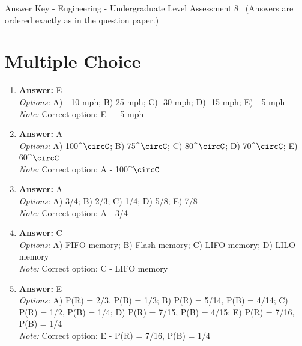 \documentclass[12pt]{article}
\begin{document}
\begin{center}
Answer Key - Engineering - Undergraduate Level Assessment 8 \
\small (Answers are ordered exactly as in the question paper.)
\end{center}

\section*{Multiple Choice}
\begin{enumerate}[label=\arabic*.]
\item \textbf{Answer:} E
\\ \textit{Options:} A) - 10 mph; B) 25 mph; C) -30 mph; D) -15 mph; E) - 5 mph
\\ \textit{Note:} Correct option: E - - 5 mph
\item \textbf{Answer:} A
\\ \textit{Options:} A) 100^\ensuremath{\circC}; B) 75^\ensuremath{\circC}; C) 80^\ensuremath{\circC}; D) 70^\ensuremath{\circC}; E) 60^\ensuremath{\circC}
\\ \textit{Note:} Correct option: A - 100^\ensuremath{\circC}
\item \textbf{Answer:} A
\\ \textit{Options:} A) 3/4; B) 2/3; C) 1/4; D) 5/8; E) 7/8
\\ \textit{Note:} Correct option: A - 3/4
\item \textbf{Answer:} C
\\ \textit{Options:} A) FIFO memory; B) Flash memory; C) LIFO memory; D) LILO memory
\\ \textit{Note:} Correct option: C - LIFO memory
\item \textbf{Answer:} E
\\ \textit{Options:} A) P(R) = 2/3, P(B) = 1/3; B) P(R) = 5/14, P(B) = 4/14; C) P(R) = 1/2, P(B) = 1/4; D) P(R) = 7/15, P(B) = 4/15; E) P(R) = 7/16, P(B) = 1/4
\\ \textit{Note:} Correct option: E - P(R) = 7/16, P(B) = 1/4
\end{enumerate}
\end{document}

